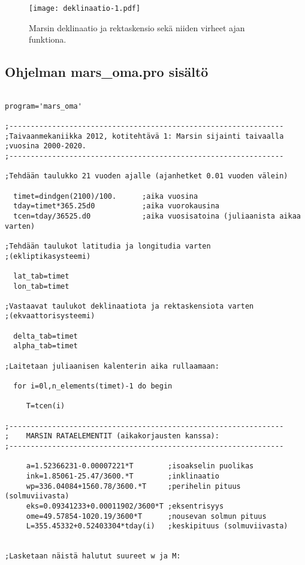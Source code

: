 \documentclass[12pt, a4paper]{article}
\begin{document}
\begin{figure}[ht]
\texttt{[image: deklinaatio-1.pdf]}
\caption{Marsin deklinaatio ja rektaskensio sekä niiden virheet ajan funktiona.}
\label{Kuva2}
\end{figure}


\newpage
\subsection[Koodi1]{Ohjelman mars\_oma.pro sisältö}\label{Koodi1}
\begin{small}
\begin{verbatim}

program='mars_oma'

;----------------------------------------------------------------
;Taivaanmekaniikka 2012, kotitehtävä 1: Marsin sijainti taivaalla
;vuosina 2000-2020.
;----------------------------------------------------------------

;Tehdään taulukko 21 vuoden ajalle (ajanhetket 0.01 vuoden välein)

  timet=dindgen(2100)/100.      ;aika vuosina
  tday=timet*365.25d0           ;aika vuorokausina
  tcen=tday/36525.d0            ;aika vuosisatoina (juliaanista aikaa varten)

;Tehdään taulukot latitudia ja longitudia varten 
;(ekliptikasysteemi)

  lat_tab=timet
  lon_tab=timet

;Vastaavat taulukot deklinaatiota ja rektaskensiota varten
;(ekvaattorisysteemi)

  delta_tab=timet
  alpha_tab=timet

;Laitetaan juliaanisen kalenterin aika rullaamaan:

  for i=0l,n_elements(timet)-1 do begin

     T=tcen(i)

;----------------------------------------------------------------
;    MARSIN RATAELEMENTIT (aikakorjausten kanssa):
;----------------------------------------------------------------

     a=1.52366231-0.00007221*T        ;isoakselin puolikas
     ink=1.85061-25.47/3600.*T        ;inklinaatio
     wp=336.04084+1560.78/3600.*T     ;perihelin pituus (solmuviivasta)
     eks=0.09341233+0.00011902/3600*T ;eksentrisyys
     ome=49.57854-1020.19/3600*T      ;nousevan solmun pituus
     L=355.45332+0.52403304*tday(i)   ;keskipituus (solmuviivasta)


;Lasketaan näistä halutut suureet w ja M:


\end{verbatim}
\end{small}
\end{document}
